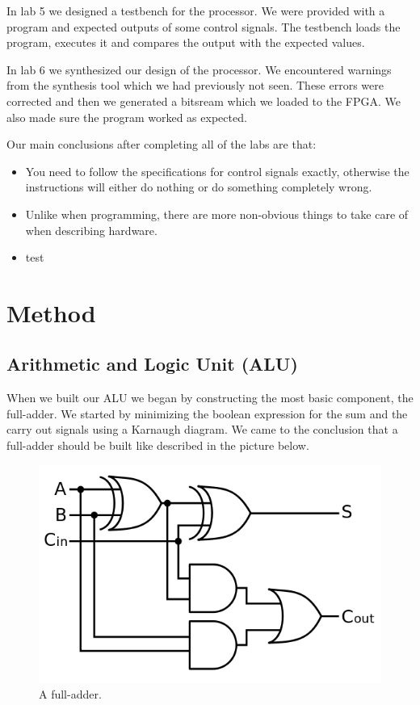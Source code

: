 \documentclass[a4paper,11pt]{article}
\begin{document}
In lab 5 we designed a testbench for the processor. We were provided with a program and expected outputs of some control signals. The testbench loads the program, executes it and compares the output with the expected values.

In lab 6 we synthesized our design of the processor. We encountered warnings from the synthesis tool which we had previously not seen. These errors were corrected and then we generated a bitsream which we loaded to the FPGA. We also made sure the program worked as expected.

Our main conclusions after completing all of the labs are that:
\begin{itemize}
	\item You need to follow the specifications for control signals exactly, otherwise the instructions will either do nothing or do something completely wrong. 
	\item Unlike when programming, there are more non-obvious things to take care of when describing hardware.
	\item test
\end{itemize}

\newpage
\section{Method}
\subsection{Arithmetic and Logic Unit (ALU)}

When we built our ALU we began by constructing the most basic component, the full-adder. We started by minimizing the boolean expression for the sum and the carry out signals using a Karnaugh diagram. We came to the conclusion that a full-adder should be built like described in the picture below.

\begin{figure}[h!]
  \centering
  \includegraphics[width=0.5\linewidth]{fulladder.png}
  \caption{A full-adder.}
  \label{fig:etikett}
\end{figure}
\end{document}

